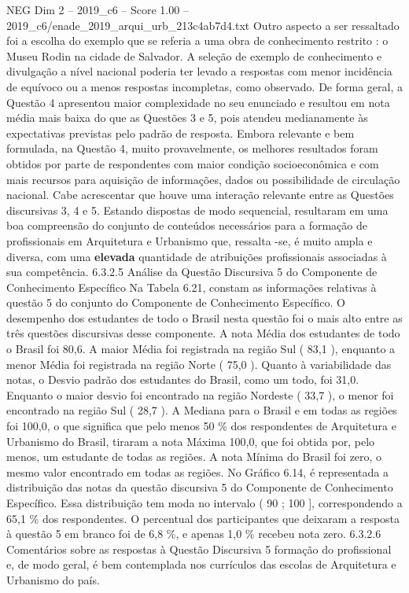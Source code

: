 \begin{textsample}{NEG Dim 2 – 2019\_c6 – Score 1.00 – 2019\_c6/enade\_2019\_arqui\_urb\_213c4ab7d4.txt}
Outro aspecto a ser ressaltado foi a escolha do exemplo que se referia a uma obra de conhecimento restrito : o Museu Rodin na cidade de Salvador.
A seleção de exemplo de conhecimento e divulgação a nível nacional poderia ter levado a respostas com menor incidência de equívoco ou a menos respostas incompletas, como observado.
De forma geral, a Questão 4 apresentou maior complexidade no seu enunciado e resultou em nota média mais baixa do que as Questões 3 e 5, pois atendeu medianamente às expectativas previstas pelo padrão de resposta.
Embora relevante e bem formulada, na Questão 4, muito provavelmente, os melhores resultados foram obtidos por parte de respondentes com maior condição socioeconômica e com mais recursos para aquisição de informações, dados ou possibilidade de circulação nacional.
Cabe acrescentar que houve uma interação relevante entre as Questões discursivas 3, 4 e 5.
Estando dispostas de modo sequencial, resultaram em uma boa compreensão do conjunto de conteúdos necessários para a formação de profissionais em Arquitetura e Urbanismo que, ressalta -se, é muito ampla e diversa, com uma \textbf{elevada} quantidade de atribuições profissionais associadas à sua competência. 6.3.2.5 Análise da Questão Discursiva 5 do Componente de Conhecimento Específico Na Tabela 6.21, constam as informações relativas à questão 5 do conjunto do Componente de Conhecimento Específico.
O desempenho dos estudantes de todo o Brasil nesta questão foi o mais alto entre as três questões discursivas desse componente.
A nota Média dos estudantes de todo o Brasil foi 80,6.
A maior Média foi registrada na região Sul ( 83,1 ), enquanto a menor Média foi registrada na região Norte ( 75,0 ).
Quanto à variabilidade das notas, o Desvio padrão dos estudantes do Brasil, como um todo, foi 31,0.
Enquanto o maior desvio foi encontrado na região Nordeste ( 33,7 ), o menor foi encontrado na região Sul ( 28,7 ).
A Mediana para o Brasil e em todas as regiões foi 100,0, o que significa que pelo menos 50 \% dos respondentes de Arquitetura e Urbanismo do Brasil, tiraram a nota Máxima 100,0, que foi obtida por, pelo menos, um estudante de todas as regiões.
A nota Mínima do Brasil foi zero, o mesmo valor encontrado em todas as regiões.
No Gráfico 6.14, é representada a distribuição das notas da questão discursiva 5 do Componente de Conhecimento Específico.
Essa distribuição tem moda no intervalo ( 90 ; 100 ], correspondendo a 65,1 \% dos respondentes.
O percentual dos participantes que deixaram a resposta à questão 5 em branco foi de 6,8 \%, e apenas 1,0 \% recebeu nota zero. 6.3.2.6 Comentários sobre as respostas à Questão Discursiva 5 formação do profissional e, de modo geral, é bem contemplada nos currículos das escolas de Arquitetura e Urbanismo do país.

\end{textsample}
